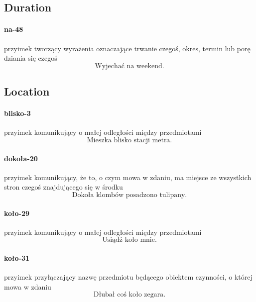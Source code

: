 \documentclass[a4paper, 12pt]{article}
\theoremstyle{remark}
\begin{document}
\subsection{Duration} %
\label{sub:duration}
\paragraph{na-48} \label{prep-48}	przyimek tworzący wyrażenia oznaczające trwanie czegoś, okres, termin lub porę dziania się czegoś
\begin{equation}
\text{Wyjechać na weekend.}
\end{equation}

\subsection{Location} %
\label{sub:location}
\paragraph{blisko-3} \label{prep-3}	przyimek komunikujący o małej odległości między przedmiotami
\begin{equation}
\text{Mieszka blisko stacji metra.}
\end{equation}
\paragraph{dokoła-20} \label{prep-20}	przyimek komunikujący, że to, o czym mowa w zdaniu, ma miejsce ze wszystkich stron czegoś znajdującego się w środku
\begin{equation}
\text{Dokoła klombów posadzono tulipany.}
\end{equation}
\paragraph{koło-29} \label{prep-29}	przyimek komunikujący o małej odległości między przedmiotami
\begin{equation}
\text{Usiądź koło mnie.}
\end{equation}
\paragraph{koło-31} \label{prep-31}	przyimek przyłączający nazwę przedmiotu będącego obiektem czynności, o której mowa w zdaniu
\begin{equation}
\text{Dłubał coś koło zegara.}
\end{equation}
\end{document}
